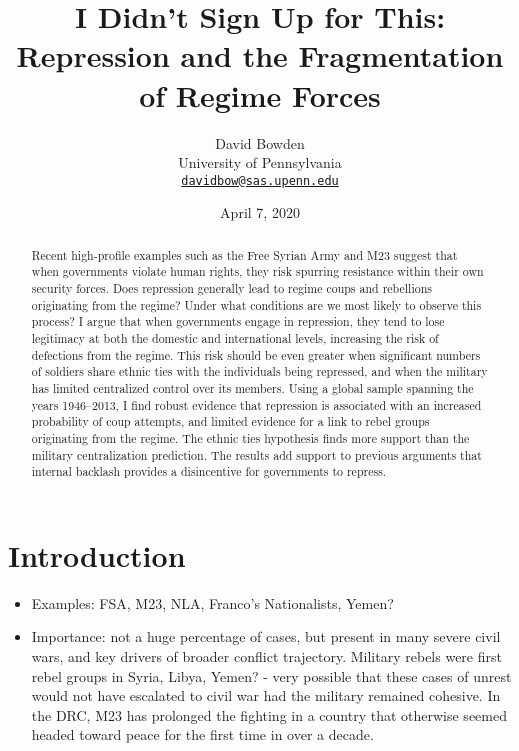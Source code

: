 \documentclass[
  12pt,
]{article}
\title{I Didn't Sign Up for This: Repression and the Fragmentation of Regime Forces}
\author{David Bowden\\
University of Pennsylvania\\
\href{mailto:davidbow@sas.upenn.edu}{\nolinkurl{davidbow@sas.upenn.edu}}}
\date{April 7, 2020}
\providecommand{\tightlist}{%
  \setlength{\itemsep}{0pt}\setlength{\parskip}{0pt}}
\begin{document}
\maketitle
\begin{abstract}
Recent high-profile examples such as the Free Syrian Army and M23 suggest that when governments violate human rights, they risk spurring resistance within their own security forces. Does repression generally lead to regime coups and rebellions originating from the regime? Under what conditions are we most likely to observe this process? I argue that when governments engage in repression, they tend to lose legitimacy at both the domestic and international levels, increasing the risk of defections from the regime. This risk should be even greater when significant numbers of soldiers share ethnic ties with the individuals being repressed, and when the military has limited centralized control over its members. Using a global sample spanning the years 1946--2013, I find robust evidence that repression is associated with an increased probability of coup attempts, and limited evidence for a link to rebel groups originating from the regime. The ethnic ties hypothesis finds more support than the military centralization prediction. The results add support to previous arguments that internal backlash provides a disincentive for governments to repress.
\end{abstract}

\doublespacing

\setlength{\parindent}{1cm}

\hypertarget{introduction}{%
\section{Introduction}\label{introduction}}

\begin{itemize}
\tightlist
\item
  Examples: FSA, M23, NLA, Franco's Nationalists, Yemen?
\item
  Importance: not a huge percentage of cases, but present in many severe civil wars, and key drivers of broader conflict trajectory. Military rebels were first rebel groups in Syria, Libya, Yemen? - very possible that these cases of unrest would not have escalated to civil war had the military remained cohesive. In the DRC, M23 has prolonged the fighting in a country that otherwise seemed headed toward peace for the first time in over a decade.
\end{itemize}
\end{document}
